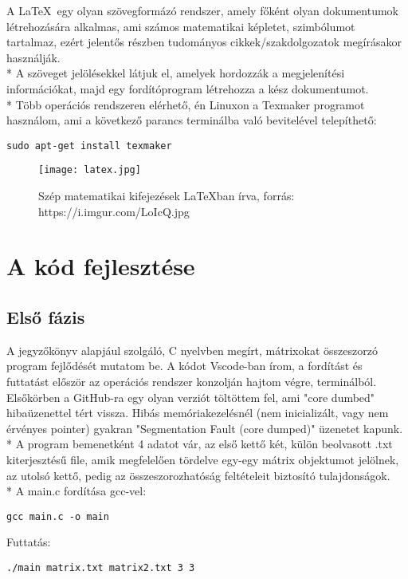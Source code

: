 \documentclass[a4paper, 12pt]{article}
\begin{document}
A \LaTeX\ egy olyan szövegformázó rendszer, amely főként olyan dokumentumok létrehozására alkalmas, ami számos matematikai képletet, szimbólumot tartalmaz, ezért jelentős részben tudományos cikkek/szakdolgozatok megírásakor használják.\\*
A szöveget jelölésekkel látjuk el, amelyek hordozzák a megjelenítési információkat, majd egy fordítóprogram létrehozza a kész dokumentumot.\\*
Több operációs rendszeren elérhető, én Linuxon a Texmaker programot használom, ami a következő parancs terminálba való bevitelével telepíthető:
\begin{verbatim}
sudo apt-get install texmaker
\end{verbatim}

\begin{figure}[h!]
\begin{center}
\texttt{[image: latex.jpg]}
\caption*{Szép matematikai kifejezések \LaTeX\-ban írva, forrás: https://i.imgur.com/LoIcQ.jpg }
\end{center}
\end{figure}


\section{A kód fejlesztése}
\subsection{Első fázis}

A jegyzőkönyv alapjául szolgáló, C nyelvben megírt, mátrixokat összeszorzó program fejlődését mutatom be. A kódot Vscode-ban írom, a fordítást és futtatást először az operációs rendszer konzolján hajtom végre, terminálból. Elsőkörben a GitHub-ra egy olyan verziót töltöttem fel, ami "core dumbed" hibaüzenettel tért vissza. Hibás memóriakezelésnél (nem inicializált, vagy nem érvényes pointer) gyakran "Segmentation Fault (core dumped)" üzenetet kapunk. \\*
A program bemenetként 4 adatot vár, az első kettő két, külön beolvasott .txt kiterjesztésű file, amik megfelelően tördelve egy-egy mátrix objektumot jelölnek, az utolsó kettő, pedig az összeszorozhatóság feltételeit biztosító tulajdonságok.\\*
A main.c fordítása gcc-vel:
\begin{verbatim}
gcc main.c -o main
\end{verbatim}
Futtatás:
\begin{verbatim}
./main matrix.txt matrix2.txt 3 3
\end{verbatim}
\end{document}
